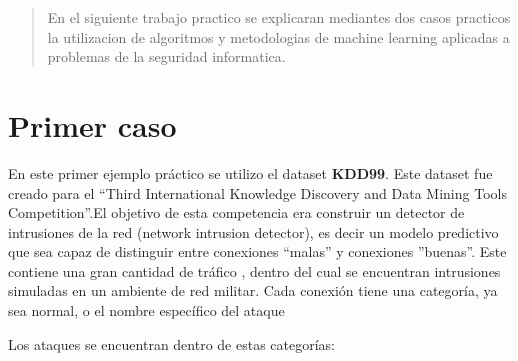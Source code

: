 \documentclass[a4paper,10pt]{article}
\begin{document}
\thispagestyle{empty}


\newpage

\tableofcontents



\begin{abstract}
	En el siguiente trabajo practico se explicaran mediantes dos casos practicos la utilizacion de algoritmos y metodologias de machine learning aplicadas a problemas de la seguridad informatica.
\end{abstract}  


\newpage
\section{Primer caso}
En este primer ejemplo práctico se utilizo el dataset \textbf{KDD99}. Este dataset fue creado para el “Third International Knowledge Discovery and Data Mining Tools Competition”.El objetivo de esta competencia era construir un detector de intrusiones de la red (network intrusion detector), es decir un modelo predictivo que sea capaz de distinguir entre conexiones “malas” y conexiones ”buenas”. Este contiene una gran cantidad de tráfico , dentro del cual se encuentran intrusiones simuladas en un ambiente de red militar.
Cada conexión tiene una categoría, ya sea normal, o el nombre específico del ataque


Los ataques se encuentran dentro de estas categorías:
\end{document}
